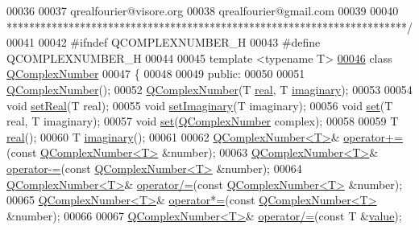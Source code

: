 \begin{DoxyCode}
00036 \textcolor{comment}{}
00037 \textcolor{comment}{qrealfourier@visore.org}
00038 \textcolor{comment}{qrealfourier@gmail.com}
00039 \textcolor{comment}{}
00040 \textcolor{comment}{***********************************************************************/}
00041 
00042 \textcolor{preprocessor}{#ifndef QCOMPLEXNUMBER\_H}
00043 \textcolor{preprocessor}{#define QCOMPLEXNUMBER\_H}
00044 
00045 \textcolor{keyword}{template} <\textcolor{keyword}{typename} T>
\hypertarget{a00114_source_l00046}{}\hyperlink{a00021}{00046} \textcolor{keyword}{class }\hyperlink{a00021}{QComplexNumber}
00047 \{
00048 
00049     \textcolor{keyword}{public}:
00050 
00051         \hyperlink{a00021_ab6cfaeb5d656fc31d881859071a5573d}{QComplexNumber}();
00052         \hyperlink{a00021_ab6cfaeb5d656fc31d881859071a5573d}{QComplexNumber}(T \hyperlink{a00021_a01ca02979072629fdf76770971bff461}{real}, T \hyperlink{a00021_a9fa649f50f64f9e8d26da107c6f779bb}{imaginary});
00053 
00054         \textcolor{keywordtype}{void} \hyperlink{a00021_a14cf134bd211f979baf2f559ae7114f9}{setReal}(T real);
00055         \textcolor{keywordtype}{void} \hyperlink{a00021_a806177c406d4fbab30385105c70c4655}{setImaginary}(T imaginary);
00056         \textcolor{keywordtype}{void} \hyperlink{a00021_ab038e64285fc23aeae05e987ec9ed9d8}{set}(T real, T imaginary);
00057         \textcolor{keywordtype}{void} \hyperlink{a00021_ab038e64285fc23aeae05e987ec9ed9d8}{set}(\hyperlink{a00021}{QComplexNumber} complex);
00058 
00059         T \hyperlink{a00021_a01ca02979072629fdf76770971bff461}{real}();
00060         T \hyperlink{a00021_a9fa649f50f64f9e8d26da107c6f779bb}{imaginary}();
00061 
00062         \hyperlink{a00021}{QComplexNumber<T>}& \hyperlink{a00021_a30e8645f1dc443e17849ed65eed5c28f}{operator+=}(\textcolor{keyword}{const} 
      \hyperlink{a00021}{QComplexNumber<T>} &number);
00063         \hyperlink{a00021}{QComplexNumber<T>}& \hyperlink{a00021_a883e0d4ed073f528ac147bb7d792fa99}{operator-=}(\textcolor{keyword}{const} 
      \hyperlink{a00021}{QComplexNumber<T>} &number);
00064         \hyperlink{a00021}{QComplexNumber<T>}& \hyperlink{a00021_a070852367a712f7b9dd2dff0ee5c3439}{operator/=}(\textcolor{keyword}{const} 
      \hyperlink{a00021}{QComplexNumber<T>} &number);
00065         \hyperlink{a00021}{QComplexNumber<T>}& \hyperlink{a00021_a13c0aad5e700fe92eb9acf5fae669975}{operator*=}(\textcolor{keyword}{const} 
      \hyperlink{a00021}{QComplexNumber<T>} &number);
00066 
00067         \hyperlink{a00021}{QComplexNumber<T>}& \hyperlink{a00021_a070852367a712f7b9dd2dff0ee5c3439}{operator/=}(\textcolor{keyword}{const} T &\hyperlink{a00116_aee90379adb0307effb138f4871edbc5c}{value});

\end{DoxyCode}
